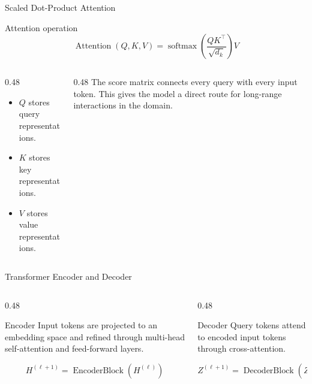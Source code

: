 \begin{frame}{Scaled Dot-Product Attention}
  \begin{block}{Attention operation}
    \[
      \operatorname{Attention}(Q,K,V)=
      \operatorname{softmax}\left(\frac{QK^{\top}}{\sqrt{d_k}}\right)V
    \]
  \end{block}
  \begin{columns}[T]
    \begin{column}{0.48\textwidth}
      \footnotesize
      \begin{itemize}
        \item $Q$ stores query representations.
        \item $K$ stores key representations.
        \item $V$ stores value representations.
      \end{itemize}
    \end{column}
    \begin{column}{0.48\textwidth}
      \footnotesize
      The score matrix connects every query with every input token. This gives
      the model a direct route for long-range interactions in the domain.
    \end{column}
  \end{columns}
\end{frame}

\begin{frame}{Transformer Encoder and Decoder}
  \begin{columns}[T]
    \begin{column}{0.48\textwidth}
      \begin{block}{Encoder}
        \footnotesize
        Input tokens are projected to an embedding space and refined through
        multi-head self-attention and feed-forward layers.
      \end{block}
      \[
        H^{(\ell+1)}=\operatorname{EncoderBlock}(H^{(\ell)})
      \]
    \end{column}
    \begin{column}{0.48\textwidth}
      \begin{block}{Decoder}
        \footnotesize
        Query tokens attend to encoded input tokens through cross-attention.
      \end{block}
      \[
        Z^{(\ell+1)}=\operatorname{DecoderBlock}(Z^{(\ell)},H)
      \]
    \end{column}
  \end{columns}
\end{frame}

